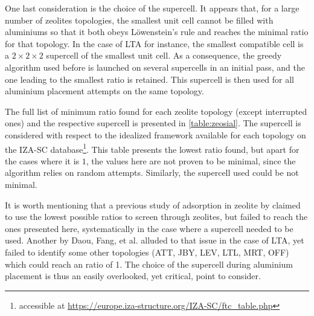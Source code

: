 \documentclass[main.tex]{subfiles}
\begin{document}
One last consideration is the choice of the supercell. It appears that, for a large number of zeolites topologies, the smallest unit cell cannot be filled with aluminiums so that it both obeys L\"owenstein's rule and reaches the minimal \SiAl ratio for that topology. In the case of LTA for instance, the smallest compatible cell is a $2\times2\times2$ supercell of the smallest unit cell. As a consequence, the greedy algorithm used before is launched on several supercells in an initial pass, and the one leading to the smallest \SiAl ratio is retained. This supercell is then used for all aluminium placement attempts on the same topology.

The full list of minimum \SiAl ratio found for each zeolite topology (except interrupted ones) and the respective supercell is presented in \cref{table:zeosial}. The supercell is considered with respect to the idealized framework available for each topology on the IZA-SC database\footnote{accessible at \url{https://europe.iza-structure.org/IZA-SC/ftc_table.php}}. This table presents the lowest \SiAl ratio found, but apart for the cases where it is $1$, the values here are not proven to be minimal, since the algorithm relies on random attempts. Similarly, the supercell used could be not minimal.

It is worth mentioning that a previous study of adsorption in zeolite by \textcite{WrongLowestSiAl1} claimed to use the lowest possible \SiAl ratios to screen through zeolites, but failed to reach the ones presented here, systematically in the case where a supercell needed to be used. Another by Daou, Fang, et al. \cite{WrongLowestSiAl2,WrongLowestSiAl3} alluded to that issue in the case of LTA, yet failed to identify some other topologies (ATT, JBY, LEV, LTL, MRT, OFF) which could reach an \SiAl ratio of 1. The choice of the supercell during aluminium placement is thus an easily overlooked, yet critical, point to consider.
\end{document}
